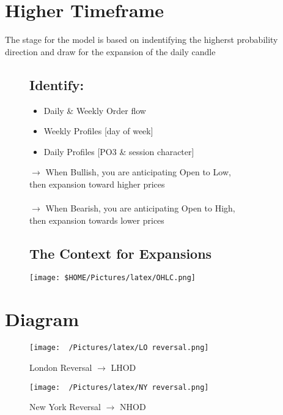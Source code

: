 \documentclass{article}
\begin{document}
\section{Higher Timeframe}
The stage for the model is based on indentifying the higherst probability direction and draw for the expansion of the daily candle

\vspace{0.6cm}
\begin{figure}[h!]
\begin{minipage}{0.7\textwidth}
\subsection{Identify:}
  \vspace{0.3cm}
  \begin{itemize}
    \item Daily \& Weekly Order flow
    \item Weekly Profiles [day of week]
    \item Daily Profiles [PO3 \& session character]
  \end{itemize}
  \vspace{0.3cm}
$ \rightarrow $ When {\color[HTML]{008000}Bullish,} you are anticipating Open to Low, \\ then expansion toward higher prices \\\\
$ \rightarrow $ When {\color[HTML]{BB5153}Bearish,} you are anticipating Open to High, \\ then expansion towards lower prices
  \vspace{0.3cm}
\subsection{The Context for Expansions}

\end{minipage}

\hfill
\begin{minipage}{0.3\textwidth}
  \texttt{[image: \$HOME/Pictures/latex/OHLC.png]}
\end{minipage}
\end{figure}




\newpage
\section{Diagram}

\begin{figure}[h!]
  \caption{London Reversal $\rightarrow$ LHOD}
\begin{adjustbox}{width=1.05\textwidth,center}
  \texttt{[image: ~/Pictures/latex/LO reversal.png]}
\end{adjustbox}
  \label{fig:image}
\end{figure}

\begin{figure}[h!]
  \caption{New York Reversal $\rightarrow$ NHOD}
\begin{adjustbox}{width=1.05\textwidth,center}
  \texttt{[image: ~/Pictures/latex/NY reversal.png]}
\end{adjustbox}
  \label{fig:image}
\end{figure}
\end{document}
